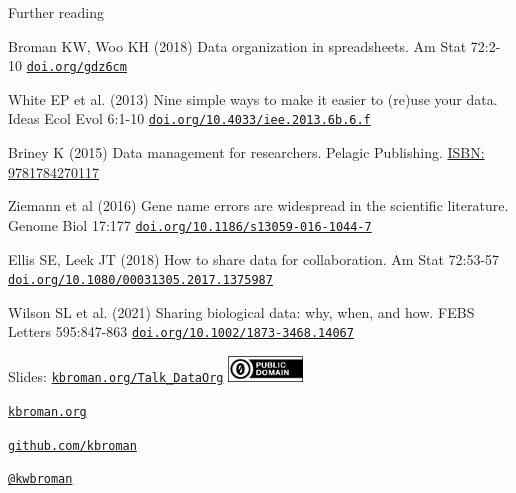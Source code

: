 \documentclass[aspectratio=169,12pt,t]{beamer}
\begin{document}
\begin{frame}{Further reading}


{\small

  \bi
\item Broman KW, Woo KH (2018) Data organization in spreadsheets. Am Stat 72:2-10
 \href{https://doi.org/gdz6cm}{\tt doi.org/gdz6cm}
\item White EP et al. (2013) Nine simple ways to make it easier to
  (re)use your data. Ideas Ecol Evol 6:1-10
  \href{https://doi.org/10.4033/iee.2013.6b.6.f}{\tt doi.org/10.4033/iee.2013.6b.6.f}
\item Briney K (2015) Data management for researchers. Pelagic
  Publishing.
  \href{https://pelagicpublishing.com/products/data-management-for-researchers-briney}{ISBN: 9781784270117}
\item Ziemann et al (2016) Gene name errors are widespread in the
  scientific literature. Genome Biol 17:177
  \href{https://doi.org/10.1186/s13059-016-1044-7}{\tt doi.org/10.1186/s13059-016-1044-7}
\item Ellis SE, Leek JT (2018) How to share data for collaboration.
  Am Stat 72:53-57
  \href{https://doi.org/10.1080/00031305.2017.1375987}{\tt doi.org/10.1080/00031305.2017.1375987}
\item Wilson SL et al. (2021) Sharing biological data: why, when, and
  how. FEBS Letters 595:847-863
  \href{https://doi.org/10.1002/1873-3468.14067}{\tt doi.org/10.1002/1873-3468.14067}
  \ei

}

  \note{
  }

\end{frame}


\begin{frame}[c]{}

\Large

Slides: \href{https://kbroman.org/Talk_DataOrg}{\tt kbroman.org/Talk\_DataOrg}
\hfill \includegraphics[height=7mm]{Figs/cc-zero.png}

\vspace{7mm}

\href{https://kbroman.org}{\tt \lolit kbroman.org}

\vspace{7mm}

\href{https://github.com/kbroman}{\tt \lolit github.com/kbroman}

\vspace{7mm}

\href{https://twitter.com/kwbroman}{\tt \lolit @kwbroman}



\end{frame}
\end{document}
